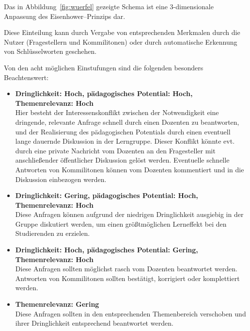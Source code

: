 Das in Abbildung~\ref{fig:wuerfel} gezeigte Schema ist eine 3-dimensionale Anpassung des Eisenhower–Prinzips dar.


Diese Einteilung kann durch Vergabe von entsprechenden Merkmalen durch die Nutzer (Fragestellern und Kommilitonen) oder durch automatische Erkennung von Schlüsselworten geschehen.

Von den acht möglichen Einstufungen sind die folgenden besonders Beachtenswert:

\begin{itemize}
	\item \textbf{Dringlichkeit: Hoch, pädagogisches Potential: Hoch, Themenrelevanz: Hoch}\\
				Hier besteht der Interessenskonflikt zwischen der Notwendigkeit eine dringende, relevante Anfrage schnell durch einen Dozenten zu beantworten, 
				und der Realisierung des pädagogischen Potentials durch einen eventuell lange dauernde Diskussion in der Lerngruppe. 
				Dieser Konflikt könnte evt. durch eine private Nachricht vom Dozenten an den Fragesteller mit anschließender öffentlicher Diskussion gelöst werden.
				Eventuelle schnelle Antworten von Kommilitonen können vom Dozenten kommentiert und in die Diskussion einbezogen werden.
				
	\item \textbf{Dringlichkeit: Gering, pädagogisches Potential: Hoch, Themenrelevanz: Hoch}\\
				Diese Anfragen können aufgrund der niedrigen Dringlichkeit ausgiebig in der Gruppe diskutiert werden, um einen größtmöglichen Lerneffekt bei den Studierenden zu erzielen.
				
	\item \textbf{Dringlichkeit: Hoch, pädagogisches Potential: Gering, Themenrelevanz: Hoch}\\
				Diese Anfragen sollten möglichst rasch vom Dozenten beantwortet werden. Antworten von Kommilitonen sollten bestätigt, korrigiert oder komplettiert werden.
				
	\item \textbf{Themenrelevanz: Gering}\\
				Diese Anfragen sollten in den entsprechenden Themenbereich verschoben und ihrer Dringlichkeit entsprechend beantwortet werden.
\end{itemize}



